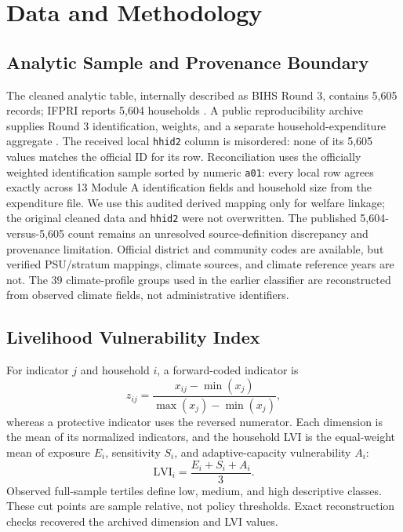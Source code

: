 \documentclass[conference,a4paper]{IEEEtran}
\begin{document}
\section{Data and Methodology}
\subsection{Analytic Sample and Provenance Boundary}
The cleaned analytic table, internally described as BIHS Round 3, contains 5,605 records; IFPRI reports 5,604 households \cite{ifpri2021bihsrelease}. A public reproducibility archive supplies Round 3 identification, weights, and a separate household-expenditure aggregate \cite{worldbank2026bihsrep}. The received local \texttt{hhid2} column is misordered: none of its 5,605 values matches the official ID for its row. Reconciliation uses the officially weighted identification sample sorted by numeric \texttt{a01}: every local row agrees exactly across 13 Module A identification fields and household size from the expenditure file. We use this audited derived mapping only for welfare linkage; the original cleaned data and \texttt{hhid2} were not overwritten. The published 5,604-versus-5,605 count remains an unresolved source-definition discrepancy and provenance limitation. Official district and community codes are available, but verified PSU/stratum mappings, climate sources, and climate reference years are not. The 39 climate-profile groups used in the earlier classifier are reconstructed from observed climate fields, not administrative identifiers.

\subsection{Livelihood Vulnerability Index}
For indicator $j$ and household $i$, a forward-coded indicator is
\begin{equation}
z_{ij}=\frac{x_{ij}-\min(x_j)}{\max(x_j)-\min(x_j)},
\end{equation}
whereas a protective indicator uses the reversed numerator. Each dimension is the mean of its normalized indicators, and the household LVI is the equal-weight mean of exposure $E_i$, sensitivity $S_i$, and adaptive-capacity vulnerability $A_i$:
\begin{equation}
\mathrm{LVI}_i=\frac{E_i+S_i+A_i}{3}.
\end{equation}
Observed full-sample tertiles define low, medium, and high descriptive classes. These cut points are sample relative, not policy thresholds. Exact reconstruction checks recovered the archived dimension and LVI values.
\end{document}
